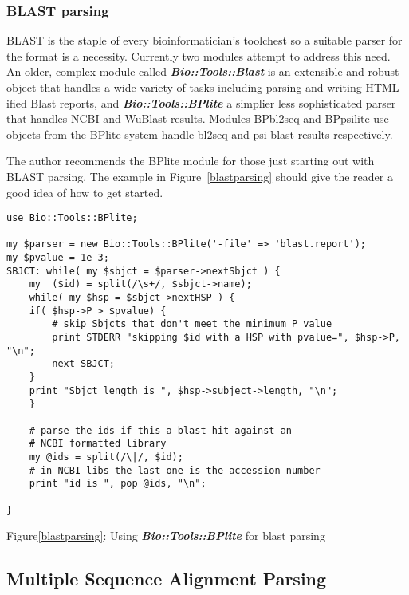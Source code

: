 \documentclass{article}
\begin{document}
\subsubsection{BLAST parsing}

BLAST is the staple of every bioinformatician's toolchest so a
suitable parser for the format is a necessity.  Currently two modules
attempt to address this need.  An older, complex module called
\emph{\bf Bio::Tools::Blast} is an extensible and robust object that
handles a wide variety of tasks including parsing and writing
HTML-ified Blast reports, and \emph{\bf Bio::Tools::BPlite} a simplier
less sophisticated parser that handles NCBI and WuBlast results.
Modules BPbl2seq and BPpsilite use objects from the BPlite system
handle bl2seq and psi-blast results respectively.   

\par The author recommends the BPlite module for those just starting
out with BLAST parsing.  The example in Figure~\ref{blastparsing}
should give the reader a good idea of how to get started.  

\begin{verbatim}
use Bio::Tools::BPlite;

my $parser = new Bio::Tools::BPlite('-file' => 'blast.report');
my $pvalue = 1e-3;
SBJCT: while( my $sbjct = $parser->nextSbjct ) {
    my  ($id) = split(/\s+/, $sbjct->name);
    while( my $hsp = $sbjct->nextHSP ) { 
	if( $hsp->P > $pvalue) {	
	    # skip Sbjcts that don't meet the minimum P value
	    print STDERR "skipping $id with a HSP with pvalue=", $hsp->P, "\n";
	    next SBJCT;    
	} 
	print "Sbjct length is ", $hsp->subject->length, "\n";	
    }

    # parse the ids if this a blast hit against an 
    # NCBI formatted library 
    my @ids = split(/\|/, $id);
    # in NCBI libs the last one is the accession number
    print "id is ", pop @ids, "\n";

}   
\end{verbatim}
\label{blastparsing}
\centerline{Figure\ref{blastparsing}: Using \emph{\bf Bio::Tools::BPlite} for
blast parsing}

\subsection{Multiple Sequence Alignment Parsing}
\end{document}
